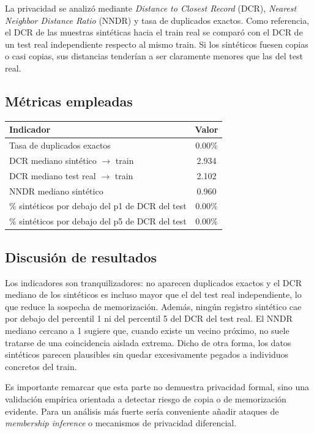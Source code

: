 \documentclass[11pt,a4paper]{article}
\begin{document}
La privacidad se analizó mediante \textit{Distance to Closest Record} (DCR), \textit{Nearest Neighbor Distance Ratio} (NNDR) y tasa de duplicados exactos. Como referencia, el DCR de las muestras sintéticas hacia el train real se comparó con el DCR de un test real independiente respecto al mismo train. Si los sintéticos fuesen copias o casi copias, sus distancias tenderían a ser claramente menores que las del test real.

\subsection*{Métricas empleadas}
\begin{table}[H]
\centering
\renewcommand{\arraystretch}{1.2}
\begin{tabular}{p{9.5cm} c}
\toprule
\textbf{Indicador} & \textbf{Valor} \\
\midrule
Tasa de duplicados exactos & 0.00\% \\
DCR mediano sintético $\rightarrow$ train & 2.934 \\
DCR mediano test real $\rightarrow$ train & 2.102 \\
NNDR mediano sintético & 0.960 \\
\% sintéticos por debajo del p1 de DCR del test & 0.00\% \\
\% sintéticos por debajo del p5 de DCR del test & 0.00\% \\
\bottomrule
\end{tabular}
\end{table}

\subsection*{Discusión de resultados}
Los indicadores son tranquilizadores: no aparecen duplicados exactos y el DCR mediano de los sintéticos es incluso mayor que el del test real independiente, lo que reduce la sospecha de memorización. Además, ningún registro sintético cae por debajo del percentil 1 ni del percentil 5 del DCR del test real. El NNDR mediano cercano a 1 sugiere que, cuando existe un vecino próximo, no suele tratarse de una coincidencia aislada extrema. Dicho de otra forma, los datos sintéticos parecen plausibles sin quedar excesivamente pegados a individuos concretos del train.

Es importante remarcar que esta parte no demuestra privacidad formal, sino una validación empírica orientada a detectar riesgo de copia o de memorización evidente. Para un análisis más fuerte sería conveniente añadir ataques de \textit{membership inference} o mecanismos de privacidad diferencial.
\end{document}
